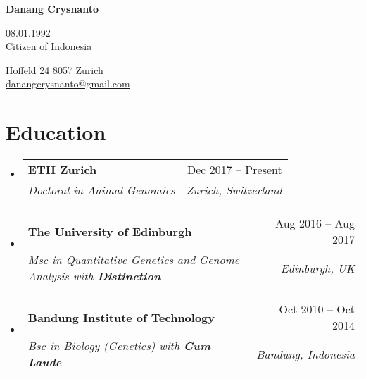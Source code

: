 \documentclass[letterpaper,10pt]{article}
\makeatletter
\newcommand{\resumeItem}[1]{
  \item\small{
    {#1 \vspace{-2pt}}
  }
}
\newcommand{\resumeSubheading}[4]{
  \vspace{-2pt}\item
    \begin{tabular*}{0.97\textwidth}[t]{l@{\extracolsep{\fill}}r}
      \textbf{#1} & #2 \\
      \textit{\small#3} & \textit{\small #4} \\
    \end{tabular*}\vspace{-7pt}
}
\newcommand{\resumeSubHeadingListStart}{\begin{itemize}[leftmargin=0.15in, label={}]}
\newcommand{\resumeSubHeadingListEnd}{\end{itemize}}
\newcommand{\resumeItemListStart}{\begin{itemize}}
\newcommand{\resumeItemListEnd}{\end{itemize}\vspace{-5pt}}
\makeatother
\begin{document}
\begin{center}
    {\LARGE \textbf{Danang Crysnanto}} \\ \vspace{2pt}
    \begin{multicols}{2}
    \begin{flushleft}
    08.01.1992 \\
    Citizen of Indonesia \\ 
    \end{flushleft}
    
    \begin{flushright}
    Hoffeld 24 8057 Zurich\\
    \href{mailto:{danangcrysnanto@gmail.com}}{danangcrysnanto@gmail.com} \\
    \end{flushright}
    \end{multicols}
\end{center}


\vspace{-2pt}
\section{Education}
  \resumeSubHeadingListStart
      \resumeSubheading
      {ETH Zurich}{Dec 2017 -- Present}
      {Doctoral in Animal Genomics}{Zurich, Switzerland}
      \resumeSubheading
      {The University of Edinburgh}{Aug 2016 -- Aug 2017}
      {Msc in Quantitative Genetics and Genome Analysis with \textbf{Distinction}}{Edinburgh, UK}
      \resumeSubheading
      {Bandung Institute of Technology}{Oct 2010 -- Oct 2014}
      {Bsc in Biology (Genetics) with \textbf{Cum Laude}}{Bandung, Indonesia}

  \resumeSubHeadingListEnd

\vspace{0.5 cm}

%
\end{document}
